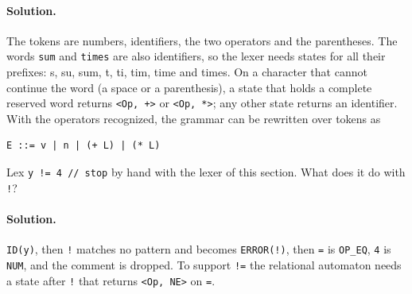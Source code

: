 \paragraph{Solution.} The tokens are numbers, identifiers, the two operators
and the parentheses. The words \texttt{sum} and \texttt{times} are also
identifiers, so the lexer needs states for all their prefixes:
s, su, sum, t, ti, tim, time and times. On a character that cannot
continue the word (a space or a parenthesis), a state that holds a complete
reserved word returns \texttt{<Op, +>} or \texttt{<Op, *>}; any other state
returns an identifier. With the operators recognized, the grammar can be
rewritten over tokens as
\begin{lstlisting}
E ::= v | n | (+ L) | (* L)
\end{lstlisting}

\begin{exercise}
Lex \texttt{y != 4 // stop} by hand with the lexer of this section. What does
it do with \texttt{!}?
\end{exercise}

\paragraph{Solution.} \texttt{ID(y)}, then \texttt{!} matches no pattern and becomes
\texttt{ERROR(!)}, then \texttt{=} is \texttt{OP\_EQ}, \texttt{4} is \texttt{NUM}, and the
comment is dropped. To support \texttt{!=} the relational automaton needs a
state after \texttt{!} that returns \texttt{<Op, NE>} on \texttt{=}.
